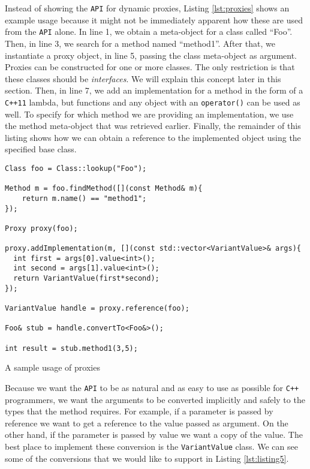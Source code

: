 Instead of showing the \texttt{API} for dynamic proxies, Listing \ref{lst:proxies} shows an example
usage because it might not be immediately apparent how these are used from the \texttt{API} alone.
In line 1, we obtain a meta-object for a class called ``Foo''. Then, in line 3, we search for a
method named ``method1''. After that, we instantiate a proxy object, in line 5, passing the class
meta-object as argument. Proxies can be constructed for one or more classes. The only restriction is
that these classes should be \emph{interfaces}. We will explain this concept later in this section.
Then, in line 7, we add an implementation for a method in the form of a \texttt{C++11} lambda, but functions
and any object with an \texttt{operator()} can be used as well. To specify for which method we are
providing an implementation, we use the method meta-object that was retrieved earlier.
Finally, the remainder of this listing shows how we can obtain a reference to the implemented object
using the specified base class.

\begin{listing}
\begin{verbatim}
Class foo = Class::lookup("Foo");

Method m = foo.findMethod([](const Method& m){
    return m.name() == "method1";
});

Proxy proxy(foo);

proxy.addImplementation(m, [](const std::vector<VariantValue>& args){
  int first = args[0].value<int>();
  int second = args[1].value<int>();
  return VariantValue(first*second);
});

VariantValue handle = proxy.reference(foo);

Foo& stub = handle.convertTo<Foo&>();

int result = stub.method1(3,5);
\end{verbatim}
\caption{A sample usage of proxies}
\label{lst:proxies}
\end{listing}

Because we want the \texttt{API} to be as natural and as easy to use as possible for \texttt{C++} programmers,
we want the arguments to be converted implicitly and safely to the types that the method requires.
For example, if a parameter is passed by reference we want to get a reference to the value passed as argument.
On the other hand, if the parameter is passed by value we want a copy of the value. The best place to implement
these conversion is the \texttt{VariantValue} class. We can see some of the conversions that we would like to
support in Listing \ref{lst:listing5}.

